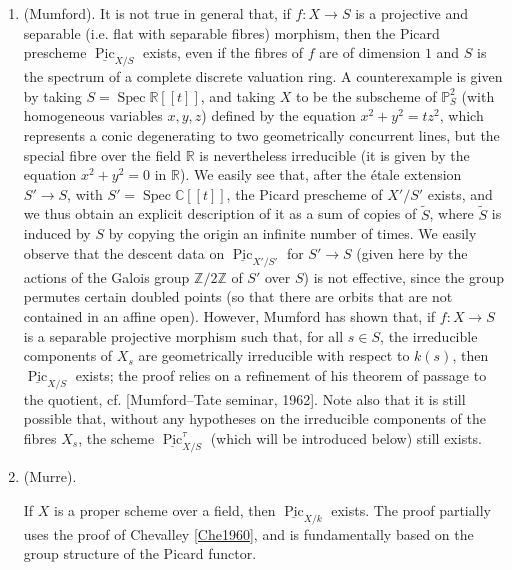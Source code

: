   
 \begin{enumerate}
    
 \item[a.]
      (Mumford).
      It is not true in general that, if \(f\colon  X\to  S\) is a projective and separable (i.e. flat with separable fibres) morphism, then the Picard prescheme \(\underline {\operatorname {Pic}}_{X/S}\) exists, even if the fibres of \(f\) are of dimension \(1\) and \(S\) is the spectrum of a complete discrete valuation ring.
      A counterexample is given by taking \(S=\operatorname {Spec}\mathbb {R}[{[t]}]\), and taking \(X\) to be the subscheme of \(\mathbb {P}_S^2\) (with homogeneous variables \(x,y,z\)) defined by the equation \(x^2+y^2=tz^2\), which represents a conic degenerating to two geometrically concurrent lines, but the special fibre over the field \(\mathbb {R}\) is nevertheless irreducible (it is given by the equation \(x^2+y^2=0\) in \(\mathbb {R}\)).
      We easily see that, after the étale extension \(S'\to  S\), with \(S'=\operatorname {Spec}\mathbb {C}[{[t]}]\), the Picard prescheme of \(X'/S'\) exists, and we thus obtain an explicit description of it as a sum of copies of \(\widetilde {S}\), where \(\widetilde {S}\) is induced by \(S\) by copying the origin an infinite number of times.
      We easily observe that the descent data on \(\underline {\operatorname {Pic}}_{X'/S'}\) for \(S'\to  S\) (given here by the actions of the Galois group \(\mathbb {Z}/2\mathbb {Z}\) of \(S'\) over \(S\)) is not effective, since the group permutes certain doubled points (so that there are orbits that are not contained in an affine open).
      However, Mumford has shown that, if \(f\colon  X\to  S\) is a separable projective morphism such that, for all \(s\in  S\), the irreducible components of \(X_s\) are geometrically irreducible with respect to \(k(s)\), then \(\underline {\operatorname {Pic}}_{X/S}\) exists;
      the proof relies on a refinement of his theorem of passage to the quotient, cf. [Mumford–Tate seminar, 1962].
      Note also that it is still possible that, without any hypotheses on the irreducible components of the fibres \(X_s\), the scheme \(\underline {\operatorname {Pic}}_{X/S}^\tau \) (which will be introduced below) still exists.
    


    
 \item[b.]
      (Murre).
      
      If \(X\) is a proper scheme over a field, then \(\underline {\operatorname {Pic}}_{X/k}\) exists.
      The proof partially uses the proof of Chevalley \hyperref[Che1960]{[Che1960]}, and is fundamentally based on the group structure of the Picard functor.
    

  \end{enumerate}



